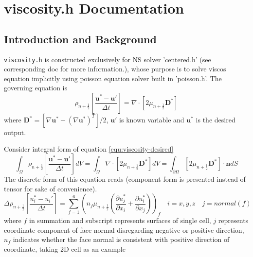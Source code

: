 \chapter{viscosity.h Documentation}
\ifsingle
\maketitle
\fi
\chaptermeta[1.0][2025-06-07]

\section{Introduction and Background}
\texttt{viscosity.h} is constructed exclusively for NS solver 'centered.h' (see corresponding doc for more information.), whose purpose is to solve viscos equation implicitly using poisson equation solver built in 'poisson.h'. The governing equation is 
\begin{equation}\label{equ:viscosity-desired}
  \rho_{n+ \frac{1}{2}}[ \frac{ \mathbf{u}^*- \mathbf{u}'}{\Delta t}] = \nabla\cdot [2\mu_{n+ \frac{1}{2}} \mathbf{D}^*]
\end{equation}
where $ \mathbf{D}^* = [\nabla \mathbf{u}^*+ (\nabla \mathbf{u}^*)^T]/2$, $ \mathbf{u}'$ is known variable and $ \mathbf{u}^*$ is the desired output.\par
Consider integral form of equation \ref{equ:viscosity-desired}
\begin{equation}
  \int_{\Omega}\rho_{n+ \frac{1}{2}} [ \frac{ \mathbf{u}^*- \mathbf{u}'}{\Delta t}]dV = \int_{\Omega}\nabla\cdot[2\mu_{n+ \frac{1}{2}} \mathbf{D}^*] dV = \int_{\partial \Omega} [2\mu_{n+ \frac{1}{2}} \mathbf{D}^*]\cdot \mathbf{n}dS
\end{equation}
The discrete form of this equation reads (component form is presented instead of tensor for sake of convenience).
\begin{equation}\label{equ:viscosity-discrete}
  \Delta \rho_{n+ \frac{1}{2}} [ \frac{u_i^*-u_i'}{\Delta t} ] = \sum_{f = 1}^6(n_f \mu_{n+ \frac{1}{2}}( \frac{\partial u_j^*}{\partial x_i}+ \frac{\partial u_i^*}{\partial x_j}))_f \quad i= x,y,z\quad j = normal(f)
\end{equation}
where $f$ in summation and subscript represents surfaces of single cell, $j$ represents coordinate component of face normal disregarding negative or positive direction, $n_f$ indicates whether the face normal is consistent with positive direction of coordinate, taking 2D cell as an example
